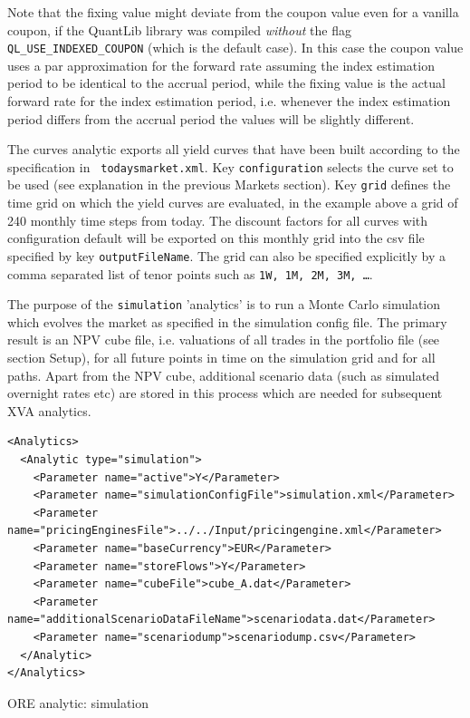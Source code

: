 \documentclass[12pt, a4paper]{article}
\begin{document}
Note that the fixing value might deviate from the coupon value even for a vanilla coupon, if the QuantLib library was
compiled {\em without} the flag \verb+QL_USE_INDEXED_COUPON+ (which is the default case). In this case the coupon value
uses a par approximation for the forward rate assuming the index estimation period to be identical to the accrual
period, while the fixing value is the actual forward rate for the index estimation period, i.e. whenever the index estimation
period differs from the accrual period the values will be slightly different.

The curves analytic exports all yield curves that have been built according to the specification in {\tt
  todaysmarket.xml}. Key {\tt configuration} selects the curve set to be used (see explanation in the previous Markets
section).  Key {\tt grid} defines the time grid on which the yield curves are evaluated, in the example above a grid of
240 monthly time steps from today. The discount factors for all curves with configuration default will be exported on
this monthly grid into the csv file specified by key {\tt outputFileName}. The grid can also be specified explicitly by
a comma separated list of tenor points such as {\tt 1W, 1M, 2M, 3M, \dots}.

\medskip The purpose of the {\tt simulation} 'analytics' is to run a Monte Carlo simulation which evolves the market as
specified in the simulation config file. The primary result is an NPV cube file, i.e. valuations of all trades in the
portfolio file (see section Setup), for all future points in time on the simulation grid and for all paths. Apart from
the NPV cube, additional scenario data (such as simulated overnight rates etc) are stored in this process which are
needed for subsequent XVA analytics.

\begin{listing}[H]
\begin{verbatim}
<Analytics>
  <Analytic type="simulation">
    <Parameter name="active">Y</Parameter>
    <Parameter name="simulationConfigFile">simulation.xml</Parameter>
    <Parameter name="pricingEnginesFile">../../Input/pricingengine.xml</Parameter>
    <Parameter name="baseCurrency">EUR</Parameter>
    <Parameter name="storeFlows">Y</Parameter>
    <Parameter name="cubeFile">cube_A.dat</Parameter>
    <Parameter name="additionalScenarioDataFileName">scenariodata.dat</Parameter>
    <Parameter name="scenariodump">scenariodump.csv</Parameter>
  </Analytic>
</Analytics>      
\end{verbatim}
\caption{ORE analytic: simulation}
\label{lst:ore_simulation}
\end{listing}
\end{document}
